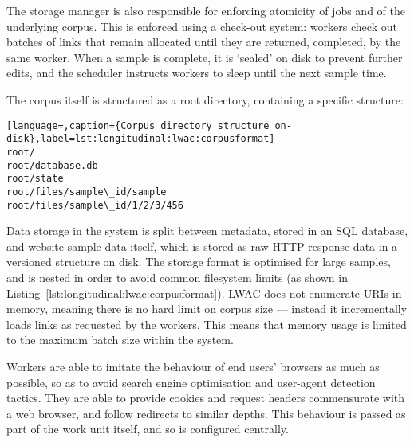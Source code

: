 The storage manager is also responsible for enforcing atomicity of jobs and of the underlying corpus.  This is enforced using a check-out system: workers check out batches of links that remain allocated until they are returned, completed, by the same worker.  When a sample is complete, it is `sealed' on disk to prevent further edits, and the scheduler instructs workers to sleep until the next sample time.


The corpus itself is structured as a root directory, containing a specific structure:

\begin{lstlisting}[language=,caption={Corpus directory structure on-disk},label=lst:longitudinal:lwac:corpusformat]
root/
root/database.db
root/state
root/files/sample\_id/sample
root/files/sample\_id/1/2/3/456
\end{lstlisting}



Data storage in the system is split between metadata, stored in an SQL database, and website sample data itself, which is stored as raw HTTP response data in a versioned structure on disk.  The storage format is optimised for large samples, and is nested in order to avoid common filesystem limits (as shown in Listing~\ref{lst:longitudinal:lwac:corpusformat}).  LWAC does not enumerate URIs in memory, meaning there is no hard limit on corpus size --- instead it incrementally loads links as requested by the workers.  This means that memory usage is limited to the maximum batch size within the system.

Workers are able to imitate the behaviour of end users' browsers as much as possible, so as to avoid search engine optimisation and user-agent detection tactics.  They are able to provide cookies and request headers commensurate with a web browser, and follow redirects to similar depths.  This behaviour is passed as part of the work unit itself, and so is configured centrally.

